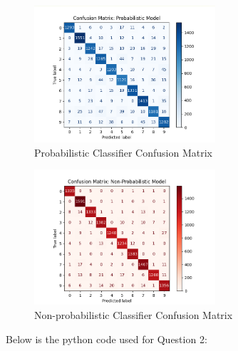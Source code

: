 \documentclass[10pt]{article}
\begin{document}
\begin{figure}[h]
    \includegraphics[width=0.6\textwidth]{../plots/q2/prob_confmatrix.png}
    \centering
    \caption{Probabilistic Classifier Confusion Matrix}
    \label{fig:prob_cmatrix}
\end{figure}

\begin{figure}[h]
    \includegraphics[width=0.6\textwidth]{../plots/q2/nonprob_confmatrix.png}
    \centering
    \caption{Non-probabilistic Classifier Confusion Matrix}
    \label{fig:nonprob_cmatrix}
\end{figure}








\clearpage
Below is the python code used for Question 2:

\end{document}
